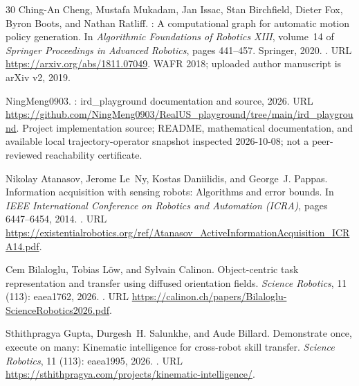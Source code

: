 \documentclass[11pt,a4paper]{article}
\numberwithin{equation}{section}
\theoremstyle{definition}
\begin{document}
\begin{thebibliography}{30}
Ching-An Cheng, Mustafa Mukadam, Jan Issac, Stan Birchfield, Dieter Fox, Byron
  Boots, and Nathan Ratliff.
: A computational graph for automatic motion policy
  generation.
\newblock In \emph{Algorithmic Foundations of Robotics XIII}, volume~14 of
  \emph{Springer Proceedings in Advanced Robotics}, pages 441--457. Springer,
  2020.
\newblock {}.
\newblock URL \url{https://arxiv.org/abs/1811.07049}.
\newblock WAFR 2018; uploaded author manuscript is arXiv v2, 2019.

{NingMeng0903}.
: {ird\_playground} documentation and source,
  2026.
\newblock URL
  \url{https://github.com/NingMeng0903/RealUS_playground/tree/main/ird_playground}.
\newblock Project implementation source; README, mathematical documentation,
  and available local trajectory-operator snapshot inspected 2026-10-08; not a
  peer-reviewed reachability certificate.

Nikolay Atanasov, Jerome Le~Ny, Kostas Daniilidis, and George~J. Pappas.
\newblock Information acquisition with sensing robots: Algorithms and error
  bounds.
\newblock In \emph{IEEE International Conference on Robotics and Automation
  (ICRA)}, pages 6447--6454, 2014.
\newblock {}.
\newblock URL
  \url{https://existentialrobotics.org/ref/Atanasov_ActiveInformationAcquisition_ICRA14.pdf}.

Cem Bilaloglu, Tobias L{\"o}w, and Sylvain Calinon.
\newblock Object-centric task representation and transfer using diffused
  orientation fields.
\newblock \emph{Science Robotics}, 11 (113): eaea1762, 2026.
\newblock {}.
\newblock URL
  \url{https://calinon.ch/papers/Bilaloglu-ScienceRobotics2026.pdf}.

Sthithpragya Gupta, Durgesh~H. Salunkhe, and Aude Billard.
\newblock Demonstrate once, execute on many: Kinematic intelligence for
  cross-robot skill transfer.
\newblock \emph{Science Robotics}, 11 (113): eaea1995, 2026.
\newblock {}.
\newblock URL \url{https://sthithpragya.com/projects/kinematic-intelligence/}.


\end{thebibliography}
\end{document}
